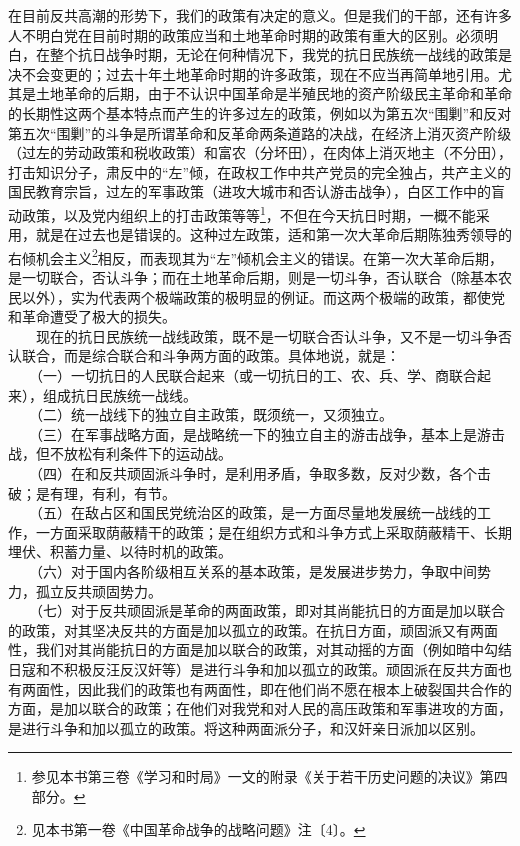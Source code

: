 \documentclass[cn,11pt,chinese]{elegantbook}
\begin{document}
在目前反共高潮的形势下，我们的政策有决定的意义。但是我们的干部，还有许多人不明白党在目前时期的政策应当和土地革命时期的政策有重大的区别。必须明白，在整个抗日战争时期，无论在何种情况下，我党的抗日民族统一战线的政策是决不会变更的；过去十年土地革命时期的许多政策，现在不应当再简单地引用。尤其是土地革命的后期，由于不认识中国革命是半殖民地的资产阶级民主革命和革命的长期性这两个基本特点而产生的许多过左的政策，例如以为第五次“围剿”和反对第五次“围剿”的斗争是所谓革命和反革命两条道路的决战，在经济上消灭资产阶级（过左的劳动政策和税收政策）和富农（分坏田），在肉体上消灭地主（不分田），打击知识分子，肃反中的“左”倾，在政权工作中共产党员的完全独占，共产主义的国民教育宗旨，过左的军事政策（进攻大城市和否认游击战争），白区工作中的盲动政策，以及党内组织上的打击政策等等\footnote[1]{ 参见本书第三卷《学习和时局》一文的附录《关于若干历史问题的决议》第四部分。}，不但在今天抗日时期，一概不能采用，就是在过去也是错误的。这种过左政策，适和第一次大革命后期陈独秀领导的右倾机会主义\footnote[2]{ 见本书第一卷《中国革命战争的战略问题》注〔4〕。}相反，而表现其为“左”倾机会主义的错误。在第一次大革命后期，是一切联合，否认斗争；而在土地革命后期，则是一切斗争，否认联合（除基本农民以外），实为代表两个极端政策的极明显的例证。而这两个极端的政策，都使党和革命遭受了极大的损失。\\
　　现在的抗日民族统一战线政策，既不是一切联合否认斗争，又不是一切斗争否认联合，而是综合联合和斗争两方面的政策。具体地说，就是：\\
　　（一）一切抗日的人民联合起来（或一切抗日的工、农、兵、学、商联合起来），组成抗日民族统一战线。\\
　　（二）统一战线下的独立自主政策，既须统一，又须独立。\\
　　（三）在军事战略方面，是战略统一下的独立自主的游击战争，基本上是游击战，但不放松有利条件下的运动战。\\
　　（四）在和反共顽固派斗争时，是利用矛盾，争取多数，反对少数，各个击破；是有理，有利，有节。\\
　　（五）在敌占区和国民党统治区的政策，是一方面尽量地发展统一战线的工作，一方面采取荫蔽精干的政策；是在组织方式和斗争方式上采取荫蔽精干、长期埋伏、积蓄力量、以待时机的政策。\\
　　（六）对于国内各阶级相互关系的基本政策，是发展进步势力，争取中间势力，孤立反共顽固势力。\\
　　（七）对于反共顽固派是革命的两面政策，即对其尚能抗日的方面是加以联合的政策，对其坚决反共的方面是加以孤立的政策。在抗日方面，顽固派又有两面性，我们对其尚能抗日的方面是加以联合的政策，对其动摇的方面（例如暗中勾结日寇和不积极反汪反汉奸等）是进行斗争和加以孤立的政策。顽固派在反共方面也有两面性，因此我们的政策也有两面性，即在他们尚不愿在根本上破裂国共合作的方面，是加以联合的政策；在他们对我党和对人民的高压政策和军事进攻的方面，是进行斗争和加以孤立的政策。将这种两面派分子，和汉奸亲日派加以区别。\\
\end{document}
